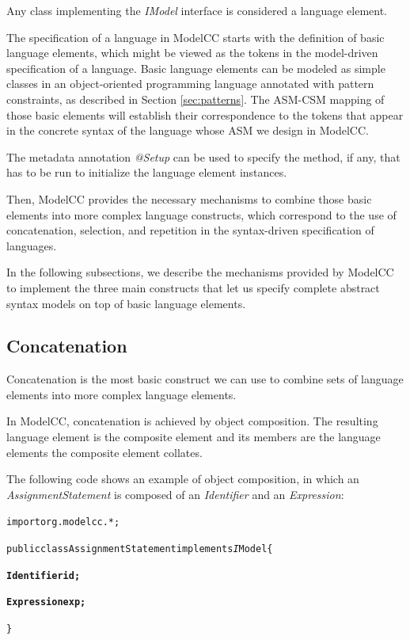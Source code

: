 \documentclass[a4paper,twoside,onecolumn]{article}
\newenvironment{colframe}{%
  \begin{Sbox} 
    \begin{minipage}{.8\columnwidth} 
}{%

  \end{minipage} 
  \end{Sbox} 
  \begin{center} 
    \fcolorbox{black}{MyGray}{\TheSbox} 
  \end{center} 
}
\begin{document}
Any class implementing the \emph{IModel} interface is considered a language element.

The specification of a language in ModelCC starts with the definition of basic language elements, which might be viewed as the tokens in the model-driven specification of a language.
Basic language elements can be modeled as simple classes in an object-oriented programming language annotated with pattern constraints, as described in Section \ref{sec:patterns}.
The ASM-CSM mapping of those basic elements will establish their correspondence to the tokens that appear in the concrete syntax of the language whose ASM we design in ModelCC.

The metadata annotation \emph{@Setup} can be used to specify the method, if any, that has to be run to initialize the language element instances.

Then, ModelCC provides the necessary mechanisms to combine those basic elements into more complex language constructs, which correspond to the use of concatenation, selection, and repetition in the syntax-driven specification of languages.

In the following subsections, we describe the mechanisms provided by ModelCC to implement the three main constructs that let us specify complete abstract syntax models on top of basic
language elements.

\subsection{Concatenation}

Concatenation is the most basic construct we can use to combine sets of language elements into more complex language elements.

In ModelCC, concatenation is achieved by object composition. The resulting language element is the composite element and its members are the language elements the composite element collates.

The following code shows an example of object composition, in which an \emph{AssignmentStatement} is composed of an \emph{Identifier} and an \emph{Expression}:

\begin{colframe}
\begin{alltt}
import org.modelcc.*;

public class AssignmentStatement implements{\emph IModel} \{

  {\bf Identifier id;}

  {\bf Expression exp;}

\}
\end{alltt}
\end{colframe}
\end{document}
